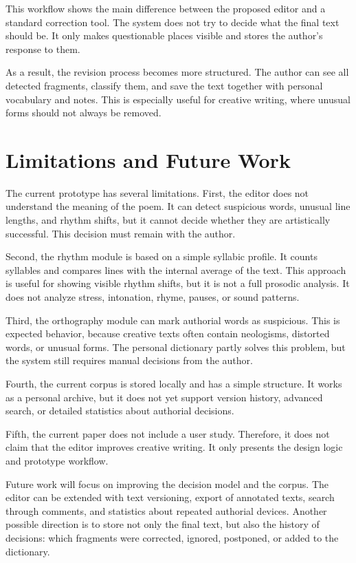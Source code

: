 \documentclass[sigconf]{acmart}
\begin{document}
This workflow shows the main difference between the proposed editor and a standard correction tool. The system does not try to decide what the final text should be. It only makes questionable places visible and stores the author's response to them.

As a result, the revision process becomes more structured. The author can see all detected fragments, classify them, and save the text together with personal vocabulary and notes. This is especially useful for creative writing, where unusual forms should not always be removed.

\section{Limitations and Future Work}

The current prototype has several limitations. First, the editor does not understand the meaning of the poem. It can detect suspicious words, unusual line lengths, and rhythm shifts, but it cannot decide whether they are artistically successful. This decision must remain with the author.

Second, the rhythm module is based on a simple syllabic profile. It counts syllables and compares lines with the internal average of the text. This approach is useful for showing visible rhythm shifts, but it is not a full prosodic analysis. It does not analyze stress, intonation, rhyme, pauses, or sound patterns.

Third, the orthography module can mark authorial words as suspicious. This is expected behavior, because creative texts often contain neologisms, distorted words, or unusual forms. The personal dictionary partly solves this problem, but the system still requires manual decisions from the author.

Fourth, the current corpus is stored locally and has a simple structure. It works as a personal archive, but it does not yet support version history, advanced search, or detailed statistics about authorial decisions.

Fifth, the current paper does not include a user study. Therefore, it does not claim that the editor improves creative writing. It only presents the design logic and prototype workflow.

Future work will focus on improving the decision model and the corpus. The editor can be extended with text versioning, export of annotated texts, search through comments, and statistics about repeated authorial devices. Another possible direction is to store not only the final text, but also the history of decisions: which fragments were corrected, ignored, postponed, or added to the dictionary.
\end{document}
